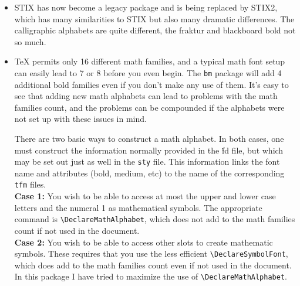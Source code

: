 \documentclass[11pt]{article}
\begin{document}
\begin{itemize}
\item STIX has now become a legacy package and is being replaced by STIX2, which has many similarities to STIX but also many dramatic differences. The calligraphic alphabets are quite different, the fraktur and blackboard bold not so much. 
\item TeX permits only 16 different math families, and a typical math font setup can easily lead to 7 or 8 before you even begin. The {\tt bm} package will add 4 additional bold families even if you don't make any use of them. It's easy to see that adding new math alphabets can lead to problems with the math families count, and the problems can be compounded if the alphabets were not set up with these issues in mind.

There are two basic ways to construct a math alphabet. In both cases, one must construct the information normally provided in the {\.fd} file, but which may be set out just as well in the {\tt sty} file. This information links the font name and attributes (bold, medium, etc) to the name of the corresponding {\tt tfm} files.\\
\textbf{Case 1:} You wish to be able to access at most the upper and lower case letters and the numeral 1 as mathematical symbols. The appropriate command is \verb|\DeclareMathAlphabet|, which does not add to the math families count if not used in the document.\\
\textbf{Case 2:}  You wish to be able to access other slots to create mathematic symbols. These requires that you use the less efficient \verb|\DeclareSymbolFont|, which does add to the math families count even if not used in the document.
In this package I have tried to  maximize the use of \verb|\DeclareMathAlphabet|.


\end{itemize}
\end{document}
